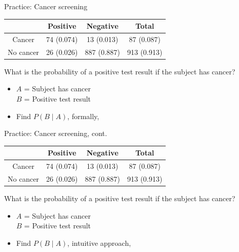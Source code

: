 \documentclass[xcolor=table, aspectratio=169, bigger, handout]{beamer}
\begin{document}
\begin{frame}{Practice: Cancer screening}
\begin{block}{}
{\centering \renewcommand{\arraystretch}{1}
\begin{tabular}{c | c  c | c}
 & Positive & Negative & Total \\
\hline
Cancer & 74 (0.074) & 13 (0.013) & 87 (0.087)\\
No cancer & 26 (0.026) & 887 (0.887) & 913 (0.913)\\
\end{tabular}\par
\renewcommand{\arraystretch}{1.5}
}
\end{block}

\begin{exampleblock}{}
What is the probability of a positive test result if the subject has cancer?
\begin{itemize}
\pause
\item $A$ = Subject has cancer\\
$B$ = Positive test result
\pause
\item Find $P(B\mid A)$, formally, \\ \smallskip 
\pause
{}
\end{itemize}
\end{exampleblock}
\end{frame}

\begin{frame}{Practice: Cancer screening, cont.}
\begin{block}{}
{\centering \renewcommand{\arraystretch}{1}
\begin{tabular}{c | c  c | c}
 & Positive & Negative & Total \\
\hline
Cancer & 74 (0.074) & 13 (0.013) & 87 (0.087)\\
No cancer & 26 (0.026) & 887 (0.887) & 913 (0.913)\\
\end{tabular}\par
\renewcommand{\arraystretch}{1.5}
}
\end{block}

\begin{exampleblock}{}
What is the probability of a positive test result if the subject has cancer?
\begin{itemize}
\item $A$ = Subject has cancer\\
$B$ = Positive test result

\item Find $P(B\mid A)$, intuitive approach,\\ \smallskip
\pause
{}
\end{itemize}
\end{exampleblock}
\end{frame}
\end{document}
